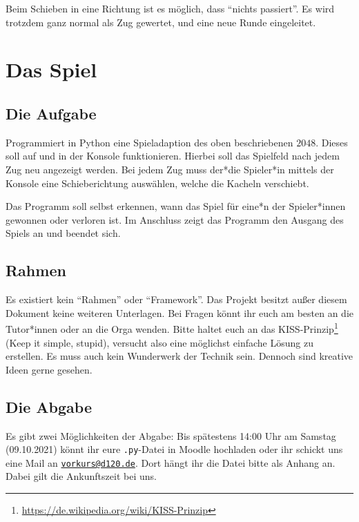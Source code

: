 \documentclass[ngerman,accentcolor=3c,colorbacktitle,12pt,T1]{tudaexercise}
\begin{document}
Beim Schieben in eine Richtung ist es möglich, dass \enquote{nichts passiert}. 
Es wird trotzdem ganz normal als Zug gewertet, und eine neue Runde eingeleitet.


\section*{Das Spiel}
\subsection*{Die Aufgabe}
Programmiert in Python eine Spieladaption des oben beschriebenen $2048$. 
Dieses soll auf und in der Konsole funktionieren. 
Hierbei soll das Spielfeld nach jedem Zug neu angezeigt werden. 
Bei jedem Zug muss der*die Spieler*in mittels der Konsole eine Schieberichtung auswählen, welche die Kacheln verschiebt.

Das Programm soll selbst erkennen, wann das Spiel für eine*n der Spieler*innen gewonnen oder verloren ist.
Im Anschluss zeigt das Programm den Ausgang des Spiels an und beendet sich.

\subsection*{Rahmen}
Es existiert kein \enquote{Rahmen} oder \enquote{Framework}. 
Das Projekt besitzt außer diesem Dokument keine weiteren Unterlagen.
Bei Fragen könnt ihr euch am besten an die Tutor*innen oder an die Orga wenden.
Bitte haltet euch an das KISS-Prinzip\footnote[2]{\url{https://de.wikipedia.org/wiki/KISS-Prinzip}} (Keep it simple, stupid), versucht also eine möglichst einfache Lösung zu erstellen. 
Es muss auch kein Wunderwerk der Technik sein. 
Dennoch sind kreative Ideen gerne gesehen.

\subsection*{Die Abgabe}
Es gibt zwei Möglichkeiten der Abgabe: Bis spätestens 14:00 Uhr am Samstag (09.10.2021) könnt ihr eure \texttt{.py}-Datei in Moodle hochladen oder ihr schickt uns eine Mail an \href{mailto:vorkurs@d120.de}{\nolinkurl{vorkurs@d120.de}}. 
Dort hängt ihr die Datei bitte als Anhang an. 
Dabei gilt die Ankunftszeit bei uns.
\end{document}
